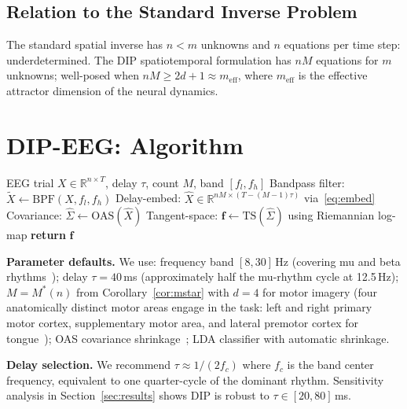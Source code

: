 \documentclass[journal]{IEEEtran}
\newcommand{\R}{\mathbb{R}}
\begin{document}
\subsection{Relation to the Standard Inverse Problem}
The standard spatial inverse has $n < m$ unknowns and $n$ equations per time step: underdetermined. The DIP spatiotemporal formulation has $nM$ equations for $m$ unknowns; well-posed when $nM \geq 2d+1 \approx m_{\text{eff}}$, where $m_{\text{eff}}$ is the effective attractor dimension of the neural dynamics.

\section{DIP-EEG: Algorithm}
\label{sec:method}

\begin{algorithm}
\caption{DIP-EEG Feature Extraction}
\label{alg:dip}
\begin{algorithmic}[1]
\REQUIRE EEG trial $X \in \R^{n \times T}$, delay $\tau$, count $M$, band $[f_l, f_h]$
\STATE Bandpass filter: $\tilde{X} \leftarrow \text{BPF}(X, f_l, f_h)$
\STATE Delay-embed: $\hat{X} \in \R^{nM \times (T-(M-1)\tau)}$ via~\eqref{eq:embed}
\STATE Covariance: $\hat{\Sigma} \leftarrow \text{OAS}(\hat{X})$ 
\STATE Tangent-space: $\mathbf{f} \leftarrow \text{TS}(\hat{\Sigma})$ using Riemannian log-map
\STATE \textbf{return} $\mathbf{f}$
\end{algorithmic}
\end{algorithm}

\textbf{Parameter defaults.} We use: frequency band $[8, 30]$\,Hz (covering mu and beta rhythms~\cite{pfurtscheller2001}); delay $\tau = 40$\,ms (approximately half the mu-rhythm cycle at 12.5\,Hz); $M = M^*(n)$ from Corollary~\ref{cor:mstar} with $d = 4$ for motor imagery (four anatomically distinct motor areas engage in the task: left and right primary motor cortex, supplementary motor area, and lateral premotor cortex for tongue~\cite{pfurtscheller2001}); OAS covariance shrinkage~\cite{chen2010oas}; LDA classifier with automatic shrinkage.

\textbf{Delay selection.} We recommend $\tau \approx 1/(2f_c)$ where $f_c$ is the band center frequency, equivalent to one quarter-cycle of the dominant rhythm. Sensitivity analysis in Section~\ref{sec:results} shows DIP is robust to $\tau \in [20, 80]$\,ms.
\end{document}

